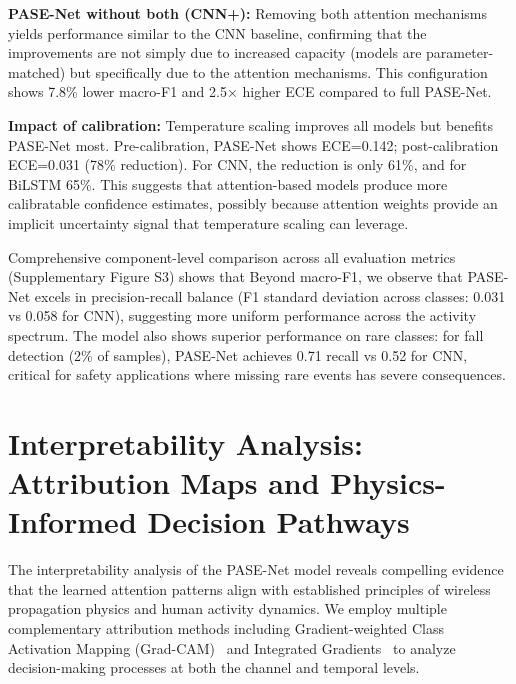 \documentclass[lettersize,journal]{IEEEtran}
\begin{document}
\textbf{PASE-Net without both (CNN+):} Removing both attention mechanisms yields performance similar to the CNN baseline, confirming that the improvements are not simply due to increased capacity (models are parameter-matched) but specifically due to the attention mechanisms. This configuration shows 7.8\% lower macro-F1 and 2.5× higher ECE compared to full PASE-Net.

\textbf{Impact of calibration:} Temperature scaling improves all models but benefits PASE-Net most. Pre-calibration, PASE-Net shows ECE=0.142; post-calibration ECE=0.031 (78\% reduction). For CNN, the reduction is only 61\%, and for BiLSTM 65\%. This suggests that attention-based models produce more calibratable confidence estimates, possibly because attention weights provide an implicit uncertainty signal that temperature scaling can leverage.


Comprehensive component-level comparison across all evaluation metrics (Supplementary Figure S3) shows that Beyond macro-F1, we observe that PASE-Net excels in precision-recall balance (F1 standard deviation across classes: 0.031 vs 0.058 for CNN), suggesting more uniform performance across the activity spectrum. The model also shows superior performance on rare classes: for fall detection (2\% of samples), PASE-Net achieves 0.71 recall vs 0.52 for CNN, critical for safety applications where missing rare events has severe consequences.

\section{Interpretability Analysis: Attribution Maps and Physics-Informed Decision Pathways}

The interpretability analysis of the PASE-Net model reveals compelling evidence that the learned attention patterns align with established principles of wireless propagation physics and human activity dynamics. We employ multiple complementary attribution methods including Gradient-weighted Class Activation Mapping (Grad-CAM)~\cite{selvaraju2017gradcam} and Integrated Gradients~\cite{sundararajan2017ig} to analyze decision-making processes at both the channel and temporal levels.
\end{document}
